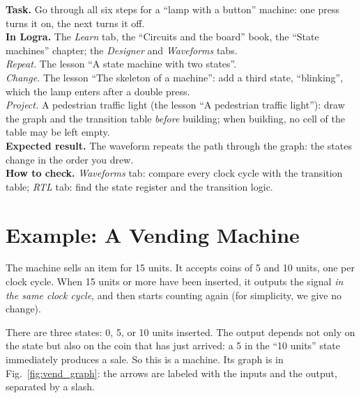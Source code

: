 \begin{diybox}
\textbf{Task.} Go through all six steps for a ``lamp with a button'' machine:
one press turns it on, the next turns it off.\\
\textbf{In Logra.} The \emph{Learn} tab, the ``Circuits and the board'' book,
the ``State machines'' chapter; the \emph{Designer} and \emph{Waveforms}
tabs.\\
 \emph{Repeat.} The lesson ``A state machine with two states''.\\
 \emph{Change.} The lesson ``The skeleton of a machine'': add a third
state, ``blinking'', which the lamp enters after a double press.\\
 \emph{Project.} A pedestrian traffic light (the lesson ``A pedestrian
traffic light''): draw the graph and the transition table \emph{before}
building; when building, no cell of the table may be left empty.\\
\textbf{Expected result.} The waveform repeats the path through the graph: the
states change in the order you drew.\\
\textbf{How to check.} \emph{Waveforms} tab: compare every clock cycle with
the transition table; \emph{RTL} tab: find the state register and the
transition logic.
\end{diybox}

\section{Example: A Vending Machine}

The machine sells an item for 15 units. It accepts coins of 5 and 10 units, one
per clock cycle. When 15 units or more have been inserted, it outputs the
signal  \emph{in the same clock cycle}, and then starts counting
again (for simplicity, we give no change).

There are three states: 0, 5, or 10 units inserted. The output depends not only
on the state but also on the coin that has just arrived: a 5 in the ``10
units'' state immediately produces a sale. So this is a  machine.
Its graph is in Fig.~\ref{fig:vend_graph}: the arrows are labeled with the
inputs and the output, separated by a slash.

